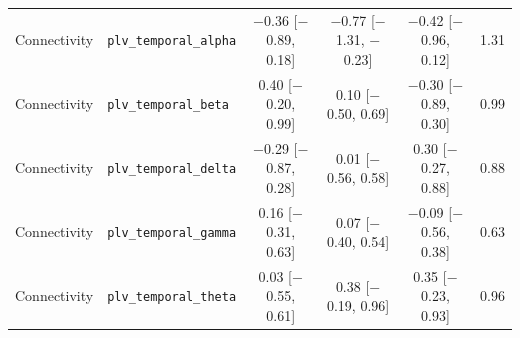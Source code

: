 {\begin{longtable}{llcccc}
Connectivity & \texttt{plv\_temporal\_alpha} & $-$0.36 [$-$0.89, 0.18] & $-$0.77 [$-$1.31, $-$0.23] & $-$0.42 [$-$0.96, 0.12] & 1.31 \\
Connectivity & \texttt{plv\_temporal\_beta} & 0.40 [$-$0.20, 0.99] & 0.10 [$-$0.50, 0.69] & $-$0.30 [$-$0.89, 0.30] & 0.99 \\
Connectivity & \texttt{plv\_temporal\_delta} & $-$0.29 [$-$0.87, 0.28] & 0.01 [$-$0.56, 0.58] & 0.30 [$-$0.27, 0.88] & 0.88 \\
Connectivity & \texttt{plv\_temporal\_gamma} & 0.16 [$-$0.31, 0.63] & 0.07 [$-$0.40, 0.54] & $-$0.09 [$-$0.56, 0.38] & 0.63 \\
Connectivity & \texttt{plv\_temporal\_theta} & 0.03 [$-$0.55, 0.61] & 0.38 [$-$0.19, 0.96] & 0.35 [$-$0.23, 0.93] & 0.96 \\
\end{longtable}
}